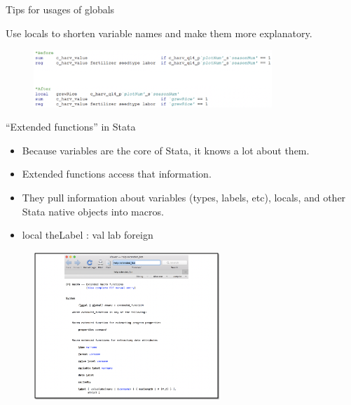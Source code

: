 \documentclass[aspectratio=169]{beamer}
\begin{document}
\begin{frame}{Tips for usages of globals}

Use locals to shorten variable names and make them more explanatory.

	\begin{figure}
	\centering
	\includegraphics[width=90mm]{img/Tips}
\end{figure}

\end{frame}


\begin{frame}[fragile]{“Extended functions” in Stata}
\begin{multicols}{2}	
	
	\begin{itemize}[<default overlay specification>]
		\item<1>  Because variables are the core of Stata, it knows a lot about them.
		\item<1>  Extended functions access that information.
		\item<1> They pull information about variables (types, labels, etc), locals, and other Stata native objects into macros.
		\item<1>  local theLabel : val lab foreign
	\end{itemize}
	
	\begin{figure}
		\centering
		\includegraphics[width=70mm, right]{img/Tips2}
	\end{figure}
	
\end{multicols}
\end{frame}
\end{document}
